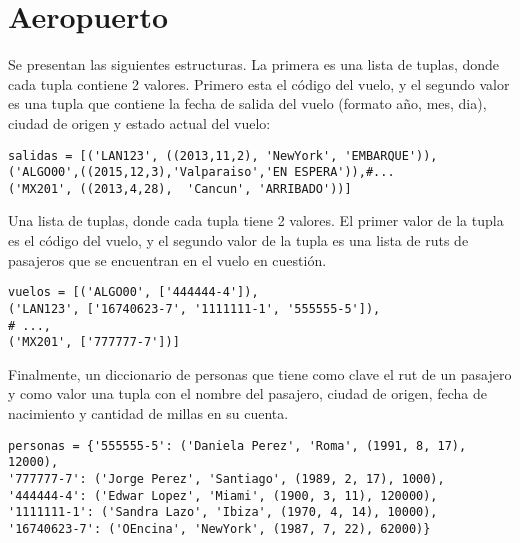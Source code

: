 \section{Aeropuerto}

Se presentan las siguientes estructuras.
La primera es una lista de tuplas, donde cada tupla contiene 2 valores. Primero esta el código del vuelo, y el segundo valor es una tupla que contiene la fecha de salida del vuelo (formato año, mes, dia), ciudad de origen y estado actual del vuelo:

\begin{lstlisting}[style=consola]
salidas = [('LAN123', ((2013,11,2), 'NewYork', 'EMBARQUE')),
('ALGO00',((2015,12,3),'Valparaiso','EN ESPERA')),#...
('MX201', ((2013,4,28),  'Cancun', 'ARRIBADO'))]
\end{lstlisting}

Una lista de tuplas, donde cada tupla tiene 2 valores. El primer valor de la tupla es el código del vuelo, y el segundo valor de la tupla es una lista de ruts de pasajeros que se encuentran en el vuelo en cuestión.

\begin{lstlisting}[style=consola]
vuelos = [('ALGO00', ['444444-4']), 
('LAN123', ['16740623-7', '1111111-1', '555555-5']), 
# ..., 
('MX201', ['777777-7'])]
\end{lstlisting}

Finalmente, un diccionario de personas que tiene como clave el rut de un pasajero y como valor una tupla con el nombre del pasajero, ciudad de origen, fecha de nacimiento y cantidad de millas en su cuenta.

\begin{lstlisting}[style=consola]
personas = {'555555-5': ('Daniela Perez', 'Roma', (1991, 8, 17), 12000), 
'777777-7': ('Jorge Perez', 'Santiago', (1989, 2, 17), 1000), 
'444444-4': ('Edwar Lopez', 'Miami', (1900, 3, 11), 120000), 
'1111111-1': ('Sandra Lazo', 'Ibiza', (1970, 4, 14), 10000), 
'16740623-7': ('OEncina', 'NewYork', (1987, 7, 22), 62000)}
\end{lstlisting}

